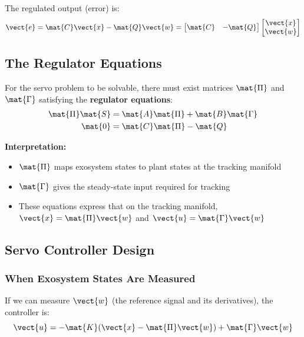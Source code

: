 The regulated output (error) is:
\begin{equation}
\vect{e} = \mat{C}\vect{x} - \mat{Q}\vect{w} = \begin{bmatrix} \mat{C} & -\mat{Q} \end{bmatrix}
\begin{bmatrix} \vect{x} \\ \vect{w} \end{bmatrix}
\end{equation}

\subsection{The Regulator Equations}

For the servo problem to be solvable, there must exist matrices $\mat{\Pi}$ and $\mat{\Gamma}$ satisfying the \textbf{regulator equations}:
\begin{align}
\mat{\Pi}\mat{S} &= \mat{A}\mat{\Pi} + \mat{B}\mat{\Gamma} \label{eq:regulator_eq1}\\
\mat{0} &= \mat{C}\mat{\Pi} - \mat{Q} \label{eq:regulator_eq2}
\end{align}

\textbf{Interpretation:}
\begin{itemize}
    \item $\mat{\Pi}$ maps exosystem states to plant states at the tracking manifold
    \item $\mat{\Gamma}$ gives the steady-state input required for tracking
    \item These equations express that on the tracking manifold, $\vect{x} = \mat{\Pi}\vect{w}$ and $\vect{u} = \mat{\Gamma}\vect{w}$
\end{itemize}

\subsection{Servo Controller Design}

\subsubsection{When Exosystem States Are Measured}

If we can measure $\vect{w}$ (the reference signal and its derivatives), the controller is:
\begin{equation}
\vect{u} = -\mat{K}(\vect{x} - \mat{\Pi}\vect{w}) + \mat{\Gamma}\vect{w}
\label{eq:servo_feedforward}
\end{equation}

